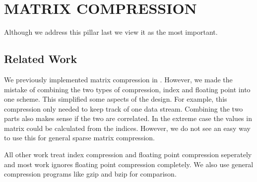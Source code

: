 \chapter{MATRIX COMPRESSION}
\label{chp:compression}
Although we address this pillar last we view it as the most important.
\section{Related Work}
We previously implemented matrix compression in \cite{}. However, we made the mistake of combining the two types of compression, index and floating point into one scheme. This simplified some aspects of the design. For example, this compression only needed to keep track of one data stream. Combining the two parts also makes sense if the two are correlated. In the extreme case the values in matrix could be calculated from the indices. However, we do not see an easy way to use this for general sparse matrix compression.

All other work treat index compression and floating point compression seperately and most work ignores floating point compression completely. We also use general compression programs like gzip and bzip for comparison.

%
%
%
%
%
%
%

